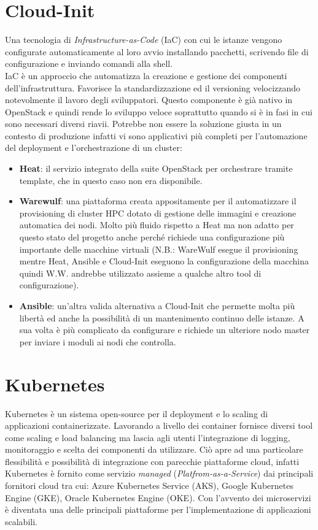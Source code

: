 \documentclass[12pt,a4paper,openright,twoside]{book}
\begin{document}
\section{Cloud-Init}
%
%
Una tecnologia di \textit{Infrastructure-as-Code} (IaC) con cui le istanze vengono configurate automaticamente al loro avvio installando pacchetti, scrivendo file di configurazione e inviando comandi alla shell. \\
IaC è un approccio che automatizza la creazione e gestione dei componenti dell'infrastruttura. Favorisce la standardizzazione ed il versioning velocizzando notevolmente il lavoro degli sviluppatori.
Questo componente è già nativo in OpenStack e quindi rende lo sviluppo veloce soprattutto quando si è in fasi in cui sono necessari diversi riavii. Potrebbe non essere la soluzione giusta in un contesto di produzione infatti vi sono applicativi più completi per l'automazione 
del deployment e l'orchestrazione di un cluster:
\begin{itemize}
    \item \textbf{Heat}: il servizio integrato della suite OpenStack per orchestrare tramite template, che in questo caso non era disponibile.
    \item \textbf{Warewulf}: una piattaforma creata appositamente per il automatizzare il provisioning di cluster HPC dotato di gestione delle immagini e creazione automatica dei nodi. Molto più fluido rispetto a Heat ma non adatto per questo stato del progetto anche perché richiede una configurazione più importante delle macchine virtuali (N.B.: WareWulf esegue il provisioning mentre Heat, Ansible e Cloud-Init eseguono la configurazione della macchina quindi W.W. andrebbe utilizzato assieme a qualche altro tool di configurazione).
    \item \textbf{Ansible}: un'altra valida alternativa a Cloud-Init che permette molta più libertà ed anche la possibilità di un mantenimento continuo delle istanze. A sua volta è più complicato da configurare e richiede un ulteriore nodo master per inviare i moduli ai nodi che controlla.
\end{itemize}
%
\section{Kubernetes}
\label{sec:kube}
%
%
Kubernetes è un sistema open-source per il deployment e lo scaling di applicazioni containerizzate. 
Lavorando a livello dei container fornisce diversi tool come scaling e load balancing ma lascia agli utenti l'integrazione di logging, monitoraggio e scelta dei componenti da utilizzare.
Ciò apre ad una particolare flessibilità e possibilità di integrazione con parecchie piattaforme cloud, infatti Kubernetes è fornito come servizio \textit{managed} (\textit{Platfrom-as-a-Service}) dai principali fornitori cloud tra cui: Azure Kubernetes Service (AKS), Google Kubernetes Engine (GKE), Oracle Kubernetes Engine (OKE).
Con l'avvento dei microservizi è diventata una delle principali piattaforme per l'implementazione di applicazioni scalabili. 
\end{document}
